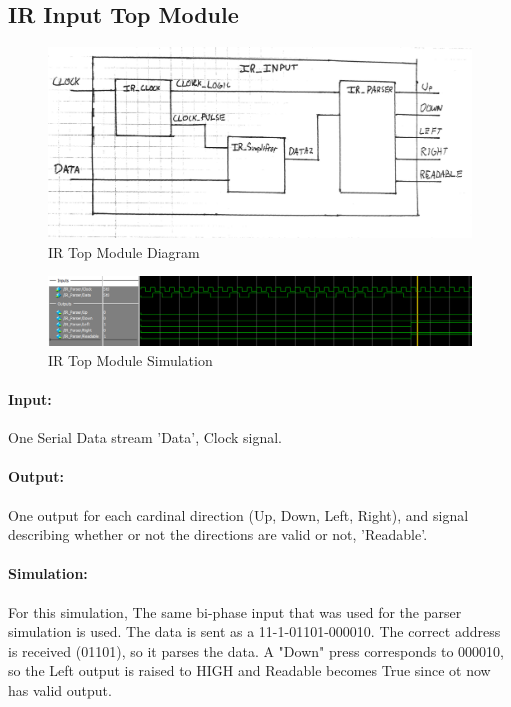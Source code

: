 \documentclass[]{article}
\begin{document}
\subsection{IR Input Top Module}
\begin{figure}[H]\centering
    \includegraphics[width=\linewidth]{figures/IR_Input_Block.jpg}
    \caption{IR Top Module Diagram}
    \label{fig:irInputDecoderBlock}
\end{figure}
\begin{figure}[H]\centering
    \includegraphics[width=\linewidth]{figures/IR_Input_Sim.PNG}
    \caption{IR Top Module Simulation}
    \label{fig:irInputDecoderSim}
\end{figure}
\paragraph{Input:} One Serial Data stream 'Data', Clock signal.
\paragraph{Output:} One output for each cardinal direction (Up, Down, Left, Right), and signal describing whether or not the directions are valid or not, 'Readable'.
\paragraph{Simulation:} For this simulation, The same bi-phase input that was used for the parser simulation is used. The data is sent as a 11-1-01101-000010.
The correct address is received (01101), so it parses the data. A "Down" press corresponds to 000010, so the Left output is raised to HIGH and Readable becomes True since ot now has valid output.
\end{document}
